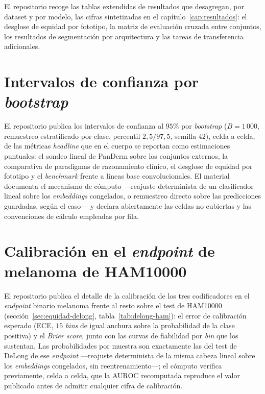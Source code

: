 El repositorio recoge las tablas extendidas de resultados que
desagregan, por dataset y por modelo, las cifras sintetizadas en el
capítulo~\ref{cap:resultados}: el desglose de equidad por fototipo,
la matriz de evaluación cruzada entre conjuntos, los resultados de
segmentación por arquitectura y las tareas de transferencia
adicionales.

\section{Intervalos de confianza por \emph{bootstrap}}
\label{sec:repo-bootstrap-ci}

El repositorio publica los intervalos de confianza al $95\%$ por
\emph{bootstrap} ($B = 1\,000$, remuestreo estratificado por clase,
percentil $2{,}5/97{,}5$, semilla $42$), celda a celda, de las
métricas \emph{headline} que en el cuerpo se reportan como
estimaciones puntuales: el sondeo lineal de PanDerm sobre los
conjuntos externos, la comparativa de paradigmas de razonamiento
clínico, el desglose de equidad por fototipo y el \emph{benchmark}
frente a líneas base convolucionales. El material documenta el
mecanismo de cómputo ---reajuste determinista de un clasificador
lineal sobre los \emph{embeddings} congelados, o remuestreo directo
sobre las predicciones guardadas, según el caso--- y declara
abiertamente las celdas no cubiertas y las convenciones de cálculo
empleadas por fila.

\section{Calibración en el \emph{endpoint} de melanoma de HAM10000}
\label{sec:repo-calibracion-ham}

El repositorio publica el detalle de la calibración de los tres
codificadores en el \emph{endpoint} binario melanoma frente al resto
sobre el test de HAM10000 (sección~\ref{sec:equidad-delong},
tabla~\ref{tab:delong-ham}): el error de calibración esperado
(ECE, $15$ \emph{bins} de igual anchura sobre la probabilidad de la
clase positiva) y el \emph{Brier score}, junto con las curvas de
fiabilidad por \emph{bin} que los sustentan. Las probabilidades por
muestra son exactamente las del test de DeLong de ese \emph{endpoint}
---reajuste determinista de la misma cabeza lineal sobre los
\emph{embeddings} congelados, sin reentrenamiento---; el cómputo
verifica previamente, celda a celda, que la AUROC recomputada reproduce
el valor publicado antes de admitir cualquier cifra de calibración.

